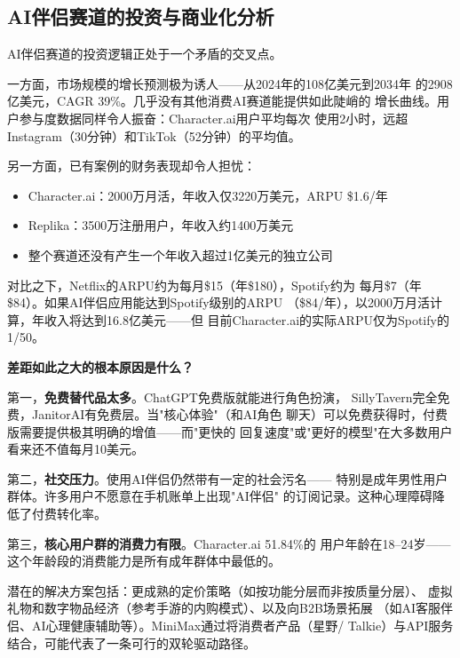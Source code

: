 \subsection{AI伴侣赛道的投资与商业化分析}
\label{subsec:companion-investment}

AI伴侣赛道的投资逻辑正处于一个矛盾的交叉点。

一方面，市场规模的增长预测极为诱人——从2024年的108亿美元到2034年
的2908亿美元，CAGR 39\%。几乎没有其他消费AI赛道能提供如此陡峭的
增长曲线。用户参与度数据同样令人振奋：Character.ai用户平均每次
使用2小时，远超Instagram（30分钟）和TikTok（52分钟）的平均值。

另一方面，已有案例的财务表现却令人担忧：

\begin{itemize}
  \item Character.ai：2000万月活，年收入仅3220万美元，ARPU \$1.6/年
  \item Replika：3500万注册用户，年收入约1400万美元
  \item 整个赛道还没有产生一个年收入超过1亿美元的独立公司
\end{itemize}

对比之下，Netflix的ARPU约为每月\$15（年\$180），Spotify约为
每月\$7（年\$84）。如果AI伴侣应用能达到Spotify级别的ARPU
（\$84/年），以2000万月活计算，年收入将达到16.8亿美元——但
目前Character.ai的实际ARPU仅为Spotify的1/50。

\textbf{差距如此之大的根本原因是什么？}

第一，\textbf{免费替代品太多}。ChatGPT免费版就能进行角色扮演，
SillyTavern完全免费，JanitorAI有免费层。当"核心体验"（和AI角色
聊天）可以免费获得时，付费版需要提供极其明确的增值——而"更快的
回复速度"或"更好的模型"在大多数用户看来还不值每月10美元。

第二，\textbf{社交压力}。使用AI伴侣仍然带有一定的社会污名——
特别是成年男性用户群体。许多用户不愿意在手机账单上出现"AI伴侣"
的订阅记录。这种心理障碍降低了付费转化率。

第三，\textbf{核心用户群的消费力有限}。Character.ai 51.84\%的
用户年龄在18--24岁——这个年龄段的消费能力是所有成年群体中最低的。

潜在的解决方案包括：更成熟的定价策略（如按功能分层而非按质量分层）、
虚拟礼物和数字物品经济（参考手游的内购模式）、以及向B2B场景拓展
（如AI客服伴侣、AI心理健康辅助等）。MiniMax通过将消费者产品（星野/
Talkie）与API服务结合，可能代表了一条可行的双轮驱动路径。

